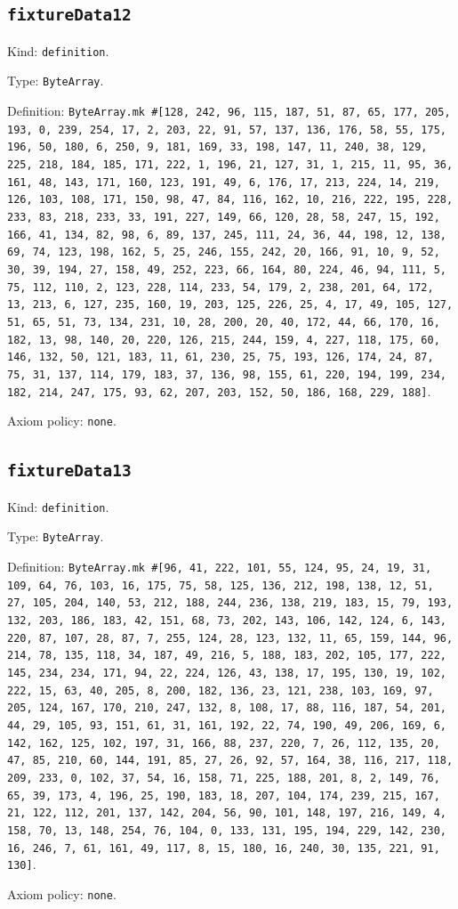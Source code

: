 \documentclass[11pt]{article}
\begin{document}
\subsection*{\texttt{fixtureData12}}
\noindent Kind: \texttt{definition}.\par
\noindent Type: \texttt{ByteArray}.\par
\noindent Definition: \texttt{ByteArray.mk \#[128, 242, 96, 115, 187, 51, 87, 65, 177, 205, 193, 0, 239, 254, 17, 2, 203, 22, 91, 57, 137, 136, 176, 58, 55, 175, 196, 50, 180, 6, 250, 9, 181, 169, 33, 198, 147, 11, 240, 38, 129, 225, 218, 184, 185, 171, 222, 1, 196, 21, 127, 31, 1, 215, 11, 95, 36, 161, 48, 143, 171, 160, 123, 191, 49, 6, 176, 17, 213, 224, 14, 219, 126, 103, 108, 171, 150, 98, 47, 84, 116, 162, 10, 216, 222, 195, 228, 233, 83, 218, 233, 33, 191, 227, 149, 66, 120, 28, 58, 247, 15, 192, 166, 41, 134, 82, 98, 6, 89, 137, 245, 111, 24, 36, 44, 198, 12, 138, 69, 74, 123, 198, 162, 5, 25, 246, 155, 242, 20, 166, 91, 10, 9, 52, 30, 39, 194, 27, 158, 49, 252, 223, 66, 164, 80, 224, 46, 94, 111, 5, 75, 112, 110, 2, 123, 228, 114, 233, 54, 179, 2, 238, 201, 64, 172, 13, 213, 6, 127, 235, 160, 19, 203, 125, 226, 25, 4, 17, 49, 105, 127, 51, 65, 51, 73, 134, 231, 10, 28, 200, 20, 40, 172, 44, 66, 170, 16, 182, 13, 98, 140, 20, 220, 126, 215, 244, 159, 4, 227, 118, 175, 60, 146, 132, 50, 121, 183, 11, 61, 230, 25, 75, 193, 126, 174, 24, 87, 75, 31, 137, 114, 179, 183, 37, 136, 98, 155, 61, 220, 194, 199, 234, 182, 214, 247, 175, 93, 62, 207, 203, 152, 50, 186, 168, 229, 188]}.\par
\noindent Axiom policy: \texttt{none}.\par
\subsection*{\texttt{fixtureData13}}
\noindent Kind: \texttt{definition}.\par
\noindent Type: \texttt{ByteArray}.\par
\noindent Definition: \texttt{ByteArray.mk \#[96, 41, 222, 101, 55, 124, 95, 24, 19, 31, 109, 64, 76, 103, 16, 175, 75, 58, 125, 136, 212, 198, 138, 12, 51, 27, 105, 204, 140, 53, 212, 188, 244, 236, 138, 219, 183, 15, 79, 193, 132, 203, 186, 183, 42, 151, 68, 73, 202, 143, 106, 142, 124, 6, 143, 220, 87, 107, 28, 87, 7, 255, 124, 28, 123, 132, 11, 65, 159, 144, 96, 214, 78, 135, 118, 34, 187, 49, 216, 5, 188, 183, 202, 105, 177, 222, 145, 234, 234, 171, 94, 22, 224, 126, 43, 138, 17, 195, 130, 19, 102, 222, 15, 63, 40, 205, 8, 200, 182, 136, 23, 121, 238, 103, 169, 97, 205, 124, 167, 170, 210, 247, 132, 8, 108, 17, 88, 116, 187, 54, 201, 44, 29, 105, 93, 151, 61, 31, 161, 192, 22, 74, 190, 49, 206, 169, 6, 142, 162, 125, 102, 197, 31, 166, 88, 237, 220, 7, 26, 112, 135, 20, 47, 85, 210, 60, 144, 191, 85, 27, 26, 92, 57, 164, 38, 116, 217, 118, 209, 233, 0, 102, 37, 54, 16, 158, 71, 225, 188, 201, 8, 2, 149, 76, 65, 39, 173, 4, 196, 25, 190, 183, 18, 207, 104, 174, 239, 215, 167, 21, 122, 112, 201, 137, 142, 204, 56, 90, 101, 148, 197, 216, 149, 4, 158, 70, 13, 148, 254, 76, 104, 0, 133, 131, 195, 194, 229, 142, 230, 16, 246, 7, 61, 161, 49, 117, 8, 15, 180, 16, 240, 30, 135, 221, 91, 130]}.\par
\noindent Axiom policy: \texttt{none}.\par
\end{document}
